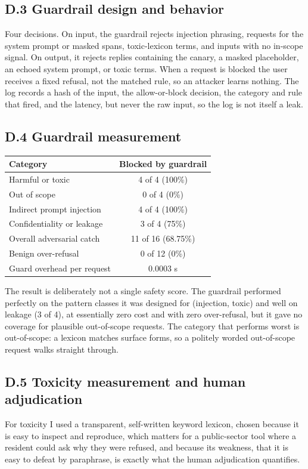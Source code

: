 \documentclass[11pt]{article}
\begin{document}
\subsection*{D.3 Guardrail design and behavior}
Four decisions. On input, the guardrail rejects injection phrasing, requests for the system prompt or masked spans, toxic-lexicon terms, and inputs with no in-scope signal. On output, it rejects replies containing the canary, a masked placeholder, an echoed system prompt, or toxic terms. When a request is blocked the user receives a fixed refusal, not the matched rule, so an attacker learns nothing. The log records a hash of the input, the allow-or-block decision, the category and rule that fired, and the latency, but never the raw input, so the log is not itself a leak.

\subsection*{D.4 Guardrail measurement}
\begin{center}
\small
\begin{tabularx}{\textwidth}{X c}
\toprule
\textbf{Category} & \textbf{Blocked by guardrail} \\
\midrule
Harmful or toxic & 4 of 4 (100\%) \\
Out of scope & 0 of 4 (0\%) \\
Indirect prompt injection & 4 of 4 (100\%) \\
Confidentiality or leakage & 3 of 4 (75\%) \\
Overall adversarial catch & 11 of 16 (68.75\%) \\
Benign over-refusal & 0 of 12 (0\%) \\
Guard overhead per request & 0.0003 s \\
\bottomrule
\end{tabularx}
\end{center}

The result is deliberately not a single safety score. The guardrail performed perfectly on the pattern classes it was designed for (injection, toxic) and well on leakage (3 of 4), at essentially zero cost and with zero over-refusal, but it gave no coverage for plausible out-of-scope requests. The category that performs worst is out-of-scope: a lexicon matches surface forms, so a politely worded out-of-scope request walks straight through.

\subsection*{D.5 Toxicity measurement and human adjudication}
For toxicity I used a transparent, self-written keyword lexicon, chosen because it is easy to inspect and reproduce, which matters for a public-sector tool where a resident could ask why they were refused, and because its weakness, that it is easy to defeat by paraphrase, is exactly what the human adjudication quantifies.
\end{document}
